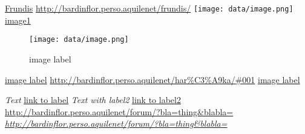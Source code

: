 \href{http://bardinflor.perso.aquilenet/frundis/}{Frundis}
\url{http://bardinflor.perso.aquilenet/frundis/}
\texttt{[image: data/image.png]}\hypertarget{label1}{}
\hyperlink{label1}{image1}

\begin{center}
\begin{figure}[htbp]
\texttt{[image: data/image.png]}
\caption{image label}
\label{fig:1}
\end{figure}
\end{center}
\hyperref[fig:1]{image label}
\url{http://bardinflor.perso.aquilenet/har\%C3\%A9ka/#001}
\hyperref[fig:1]{image label}

\hypertarget{label3}{}\emph{Text}
\hyperlink{label3}{link to label}
\hypertarget{label2}{}\emph{Text with label2}
\hyperlink{label2}{link to label2}
\url{http://bardinflor.perso.aquilenet/forum/?bla=thing&blabla=}
\emph{\url{http://bardinflor.perso.aquilenet/forum/?bla=thing&blabla=}}

